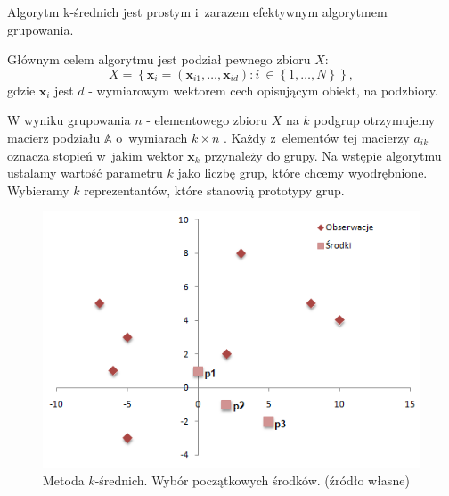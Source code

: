 \documentclass[12pt,a4paper]{report}
\newcommand{\set}[1]{\left\lbrace {#1} \right\rbrace}
\begin{document}
Algorytm k-średnich jest prostym i~zarazem efektywnym algorytmem grupowania.

Głównym celem algorytmu jest podział pewnego zbioru $\mathit{X}$:
$$
\mathit{X} = \set{\mathbf{x}_i = (\mathbf{x}_{i1},\ldots,\mathbf{x}_{id}) : i~\in \set{1,\ldots,N}},
$$
gdzie $\mathbf{x}_i$ jest $d$ - wymiarowym wektorem cech opisującym obiekt, na podzbiory.

W wyniku grupowania $n$ - elementowego zbioru $\mathit{X}$ na $k$ podgrup otrzymujemy macierz podziału $\mathbb{A}$ o~wymiarach $k\times n$ . Każdy z~elementów tej macierzy $a_{ik}$ oznacza stopień w~jakim wektor $\mathbf{x}_k$ przynależy do grupy. Na wstępie algorytmu ustalamy wartość parametru $k$ jako liczbę grup, które chcemy wyodrębnione. Wybieramy $k$ reprezentantów, które stanowią prototypy grup.
\begin{center}
\begin{figure}[H]
\centering
\includegraphics[scale=0.8]{obrazy/ks_0.PNG} 
\caption{Metoda $k$-średnich. Wybór początkowych środków. (źródło własne)}
\end{figure}
\end{center}
\end{document}
